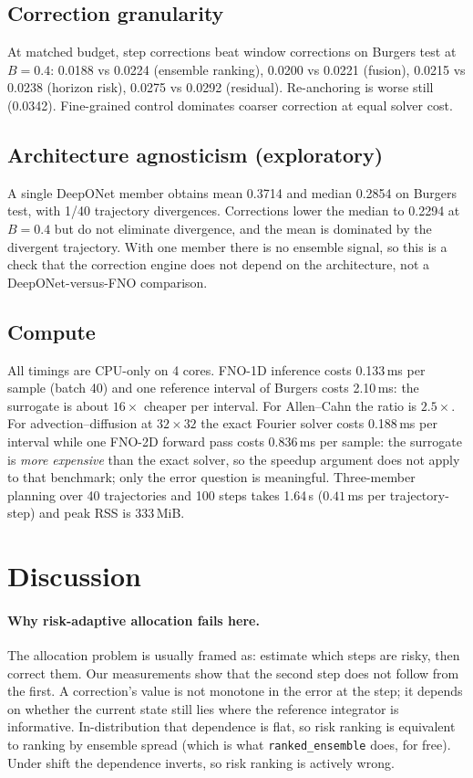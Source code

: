 \documentclass[11pt]{article}
\begin{document}
\subsection{Correction granularity}
At matched budget, step corrections beat window corrections on Burgers test at
$B=0.4$: 0.0188 vs 0.0224 (ensemble ranking), 0.0200 vs 0.0221 (fusion), 0.0215
vs 0.0238 (horizon risk), 0.0275 vs 0.0292 (residual). Re-anchoring is worse
still (0.0342). Fine-grained control dominates coarser correction at equal
solver cost.

\subsection{Architecture agnosticism (exploratory)}
A single DeepONet member obtains mean 0.3714 and median 0.2854 on Burgers test,
with 1/40 trajectory divergences. Corrections lower the median to 0.2294 at
$B=0.4$ but do not eliminate divergence, and the mean is dominated by the
divergent trajectory. With one member there is no ensemble signal, so this is a
check that the correction engine does not depend on the architecture, not a
DeepONet-versus-FNO comparison.

\subsection{Compute}
\label{sec:compute}

All timings are CPU-only on 4 cores. FNO-1D inference costs 0.133\,ms per sample
(batch 40) and one reference interval of Burgers costs 2.10\,ms: the surrogate is
about $16\times$ cheaper per interval. For Allen--Cahn the ratio is $2.5\times$.
For advection--diffusion at $32\times32$ the exact Fourier solver costs
0.188\,ms per interval while one FNO-2D forward pass costs 0.836\,ms per sample:
the surrogate is \emph{more expensive} than the exact solver, so the speedup
argument does not apply to that benchmark; only the error question is
meaningful. Three-member planning over 40 trajectories and 100 steps takes
1.64\,s ($0.41$\,ms per trajectory-step) and peak RSS is 333\,MiB.

\section{Discussion}

\paragraph{Why risk-adaptive allocation fails here.} The allocation problem is
usually framed as: estimate which steps are risky, then correct them. Our
measurements show that the second step does not follow from the first. A
correction's value is not monotone in the error at the step; it depends on
whether the current state still lies where the reference integrator is
informative. In-distribution that dependence is flat, so risk ranking is
equivalent to ranking by ensemble spread (which is what
\texttt{ranked\_ensemble} does, for free). Under shift the dependence inverts,
so risk ranking is actively wrong.
\end{document}
